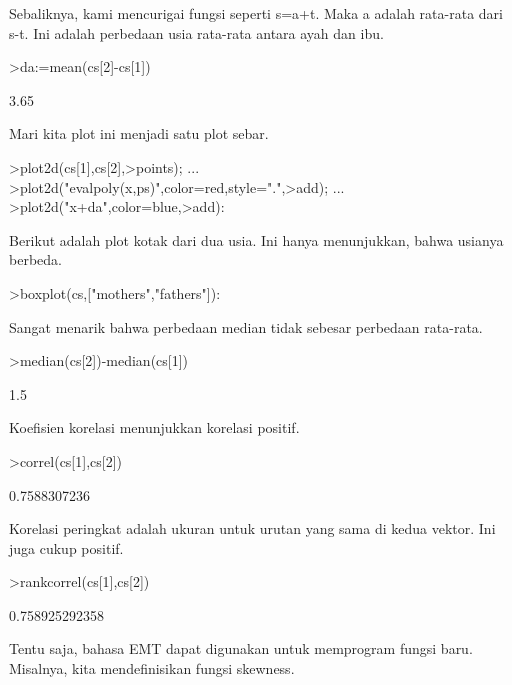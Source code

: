 \documentclass[a4paper,10pt]{article}
\begin{document}
\begin{eulernotebook}
\begin{eulercomment}
Sebaliknya, kami mencurigai fungsi seperti s=a+t. Maka a adalah
rata-rata dari s-t. Ini adalah perbedaan usia rata-rata antara ayah
dan ibu.
\end{eulercomment}
\begin{eulerprompt}
>da:=mean(cs[2]-cs[1])
\end{eulerprompt}
\begin{euleroutput}
  3.65
\end{euleroutput}
\begin{eulercomment}
Mari kita plot ini menjadi satu plot sebar.
\end{eulercomment}
\begin{eulerprompt}
>plot2d(cs[1],cs[2],>points);  ...
>plot2d("evalpoly(x,ps)",color=red,style=".",>add);  ...
>plot2d("x+da",color=blue,>add):
\end{eulerprompt}
\begin{eulercomment}
Berikut adalah plot kotak dari dua usia. Ini hanya menunjukkan, bahwa
usianya berbeda.
\end{eulercomment}
\begin{eulerprompt}
>boxplot(cs,["mothers","fathers"]):
\end{eulerprompt}
\begin{eulercomment}
Sangat menarik bahwa perbedaan median tidak sebesar perbedaan
rata-rata.
\end{eulercomment}
\begin{eulerprompt}
>median(cs[2])-median(cs[1])
\end{eulerprompt}
\begin{euleroutput}
  1.5
\end{euleroutput}
\begin{eulercomment}
Koefisien korelasi menunjukkan korelasi positif.
\end{eulercomment}
\begin{eulerprompt}
>correl(cs[1],cs[2])
\end{eulerprompt}
\begin{euleroutput}
  0.7588307236
\end{euleroutput}
\begin{eulercomment}
Korelasi peringkat adalah ukuran untuk urutan yang sama di kedua
vektor. Ini juga cukup positif.
\end{eulercomment}
\begin{eulerprompt}
>rankcorrel(cs[1],cs[2])
\end{eulerprompt}
\begin{euleroutput}
  0.758925292358
\end{euleroutput}
\begin{eulercomment}
Tentu saja, bahasa EMT dapat digunakan untuk memprogram fungsi baru.
Misalnya, kita mendefinisikan fungsi skewness.


\end{eulercomment}
\end{eulernotebook}
\end{document}
